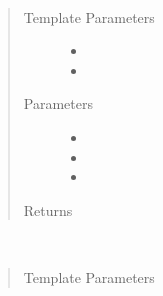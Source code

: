 \documentclass[letterpaper,10pt,english]{sphinxmanual}
\begin{document}
\begin{fulllineitems}
\begin{fulllineitems}
\pysigstopmultiline~\begin{quote}\begin{description}
\item[{Template Parameters}] \leavevmode\begin{itemize}
\item {} 
 \textendash{} 

\item {} 
 \textendash{} 

\end{itemize}

\item[{Parameters}] \leavevmode\begin{itemize}
\item {} 
 \textendash{} 

\item {} 
 \textendash{} 

\item {} 
 \textendash{} 

\end{itemize}

\item[{Returns}] \leavevmode


\end{description}\end{quote}

\end{fulllineitems}


\begin{fulllineitems}
\label{\detokenize{programming-interface/data/buffer:_CPPv4I0EN6buffer14set_final_dataEv11Destination}}%
\pysigstartmultiline
{}%
\pysigstopmultiline~\begin{quote}\begin{description}
\item[{Template Parameters}] \leavevmode
{} \textendash{} 


\end{description}
\end{quote}
\end{fulllineitems}
\end{fulllineitems}
\end{document}
